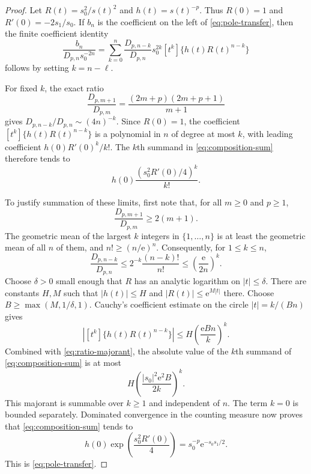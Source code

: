 \documentclass[11pt,a4paper]{article}
\numberwithin{equation}{section}
\theoremstyle{definition}
\theoremstyle{remark}
\newcommand{\ee}{\mathrm e}
\newcommand{\coef}[2]{[#1^{#2}]}
\begin{document}
\begin{proof}
Let $R(t)=s_0^2/s(t)^2$ and $h(t)=s(t)^{-p}$.  Thus $R(0)=1$ and
$R'(0)=-2s_1/s_0$.  If $b_n$ is the coefficient on the left of
\eqref{eq:pole-transfer}, then the finite coefficient identity
\begin{equation}
 \frac{b_n}{D_{p,n}s_0^{-2n}}
  =\sum_{k=0}^n
       \frac{D_{p,n-k}}{D_{p,n}}s_0^{2k}
       \coef{t}{k}\{h(t)R(t)^{n-k}\}
 \label{eq:composition-sum}
\end{equation}
follows by setting $k=n-\ell$.

For fixed $k$, the exact ratio
\[
 \frac{D_{p,m+1}}{D_{p,m}}
       =\frac{(2m+p)(2m+p+1)}{m+1}
\]
gives
$D_{p,n-k}/D_{p,n}\sim(4n)^{-k}$.
Since $R(0)=1$, the coefficient
$\coef{t}{k}\{h(t)R(t)^{n-k}\}$ is a polynomial in $n$ of degree at
most $k$, with leading coefficient $h(0)R'(0)^k/k!$.  The $k$th summand
in \eqref{eq:composition-sum} therefore tends to
\[
 h(0)\frac{(s_0^2R'(0)/4)^k}{k!}.
\]

To justify summation of these limits, first note that, for all $m\ge0$
and $p\ge1$,
\[
 \frac{D_{p,m+1}}{D_{p,m}}\ge2(m+1).
\]
The geometric mean of the largest $k$ integers in $\{1,\ldots,n\}$
is at least the geometric mean of all $n$ of them, and
$n!\ge(n/\ee)^n$.  Consequently, for $1\le k\le n$,
\begin{equation}
 \frac{D_{p,n-k}}{D_{p,n}}
 \le2^{-k}\frac{(n-k)!}{n!}
 \le\left(\frac{\ee}{2n}\right)^k.
 \label{eq:ratio-majorant}
\end{equation}
Choose $\delta>0$ small enough that $R$ has an analytic logarithm on
$|t|\le\delta$.  There are constants $H,M$ such that
$|h(t)|\le H$ and $|R(t)|\le\ee^{M|t|}$ there.
Choose $B\ge\max(M,1/\delta,1)$.
Cauchy's coefficient estimate on the circle $|t|=k/(Bn)$ gives
\[
 \left|\coef{t}{k}\{h(t)R(t)^{n-k}\}\right|
       \le H\left(\frac{\ee Bn}{k}\right)^k.
\]
Combined with \eqref{eq:ratio-majorant}, the absolute value of the
$k$th summand of \eqref{eq:composition-sum} is at most
\begin{equation}
 H\left(\frac{|s_0|^2\ee^2B}{2k}\right)^k.
 \label{eq:summable-majorant}
\end{equation}
This majorant is summable over $k\ge1$ and independent of $n$.
The term $k=0$ is bounded separately.  Dominated convergence in the
counting measure now proves that \eqref{eq:composition-sum} tends to
\[
 h(0)\exp\left(\frac{s_0^2R'(0)}4\right)
       =s_0^{-p}\ee^{-s_0s_1/2}.
\]
This is \eqref{eq:pole-transfer}.
\end{proof}
\end{document}
